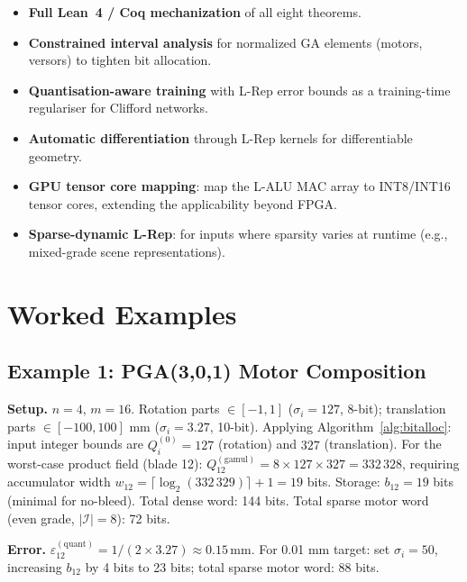 \documentclass[11pt,a4paper]{article}
\theoremstyle{definition}
\theoremstyle{plain}
\theoremstyle{remark}
\begin{document}
\begin{itemize}
  \item \textbf{Full Lean~4 / Coq mechanization} of all eight theorems.
  \item \textbf{Constrained interval analysis} for normalized GA elements
        (motors, versors) to tighten bit allocation.
  \item \textbf{Quantisation-aware training} with L-Rep error bounds as
        a training-time regulariser for Clifford networks.
  \item \textbf{Automatic differentiation} through L-Rep kernels for
        differentiable geometry.
  \item \textbf{GPU tensor core mapping}: map the L-ALU MAC array to
        INT8/INT16 tensor cores, extending the applicability beyond FPGA.
  \item \textbf{Sparse-dynamic L-Rep}: for inputs where sparsity varies
        at runtime (e.g., mixed-grade scene representations).
\end{itemize}

\section{Worked Examples}
\label{sec:examples}

\subsection{Example 1: PGA(3,0,1) Motor Composition}

\textbf{Setup.}
$n=4$, $m=16$.
Rotation parts $\in [-1,1]$ ($\sigma_i = 127$, 8-bit);
translation parts $\in [-100,100]$ mm ($\sigma_i = 3.27$, 10-bit).
Applying Algorithm~\ref{alg:bitalloc}:
input integer bounds are $Q_i^{(0)} = 127$ (rotation) and $327$ (translation).
For the worst-case product field (blade 12):
$Q_{12}^{(\mathrm{gamul})} = 8 \times 127 \times 327 = 332\,328$,
requiring accumulator width $w_{12} = \lceil\log_2(332\,329)\rceil + 1 = 19$ bits.
Storage: $b_{12} = 19$ bits (minimal for no-bleed).
Total dense word: 144 bits.
Total sparse motor word (even grade, $|\mathcal{I}|=8$): 72 bits.

\textbf{Error.}
$\varepsilon_{12}^{(\mathrm{quant})} = 1/(2 \times 3.27) \approx 0.15\,\text{mm}$.
For 0.01 mm target: set $\sigma_i = 50$, increasing $b_{12}$ by 4 bits to 23 bits;
total sparse motor word: 88 bits.
\end{document}
